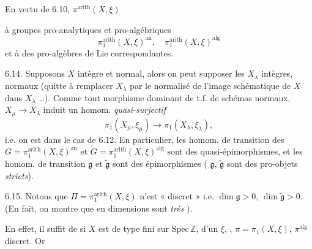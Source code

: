 \documentclass[11pt,a4paper]{article}
\begin{document}
En vertu de 6.10, $\pi^{\mathrm{arith}}(X,\xi)$ \ill{} \ill{}

 à   groupes pro-analytiques et
pro-algébriques
\[
  \pi_1^{\mathrm{arith}}(X,\xi)^{\mathrm{an}}, \quad \pi_1^{\mathrm{arith}}(X,\xi)^{\mathrm{alg}}
\]
et à des pro-algèbres de Lie correspondantes.

6.14. Supposons $X$ intègre et normal, alors on peut supposer les $X_\lambda$
intègres, normaux (quitte à \struck{\ill{}} remplacer $X_\lambda$ par le normalisé
de l'image schématique  de $X$ dans $X_\lambda$ …).
\struck{\ill{}} Comme tout morphisme dominant de t.f. de schémas normaux,
$X_\mu \to X_\lambda$ induit un \struck{\ill{}} homom. \emph{quasi-surjectif}
\[
  \pi_1(X_\mu, \xi_\mu) \longrightarrow \pi_1(X_\lambda, \xi_\lambda),
\]
i.e. on est dans le cas de 6.12. En particulier, les \struck{\ill{}} homom. de
transition des \struck{\ill{}} $G = \pi_1^{\mathrm{arith}}(X,\xi)^{\mathrm{an}}$ et
$\widetilde{G} = \pi_1^{\mathrm{arith}}(X,\xi)^{\mathrm{alg}}$ sont des
quasi-épimorphismes, et les homom. de transition \struck{\ill{}} 
$\mathfrak{g}$ et $\widetilde{\mathfrak{g}}$ sont des épimorphismes (
 $\mathfrak{g}$, $\widetilde{\mathfrak{g}}$ sont des pro-objets
\emph{stricts}).

6.15. Notons que  \add{\ill{}}
\struck{\ill{}}  $\Pi = \pi_1^{\mathrm{arith}}(X,\xi)$ n'est
\struck{\ill{}}  « discret » i.e. \ill{} $\dim \mathfrak{g} > 0$,
   $\dim \widetilde{\mathfrak{g}} > 0$.
(En fait, on montre que en \uncertain{\ill{}} dimensions sont \emph{très} ).

En effet, il suffit de \struck{\ill{} \ill{} \ill{} \ill{}} 
 si $X$ est de type fini sur $\mathrm{Spec}\,\mathbb{Z}$, \ill{} \ill{}
d'un 
  $\xi$, , 
 $\pi = \pi_1(X,\xi)$, $\pi^{\mathrm{alg}}$ 
 discret. Or
\end{document}
